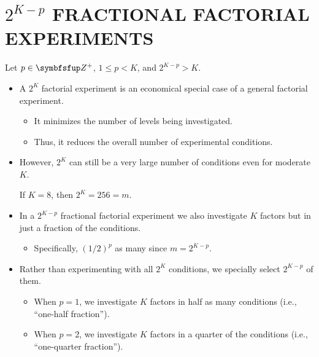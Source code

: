 \chapter{\texorpdfstring{$ 2^{K-p} $}{2K-p} FRACTIONAL FACTORIAL EXPERIMENTS}
Let $ p\in\Field{Z}^+ $, $ 1\le p<K $, and $ 2^{K-p}>K $.
\begin{itemize}[*]
    \item A $ 2^K $ factorial experiment is an economical special case of a general factorial experiment.
          \begin{itemize}[$\rightarrow$]
              \item It minimizes the number of levels being investigated.
              \item Thus, it reduces the overall number of experimental conditions.
          \end{itemize}
\end{itemize}
\begin{itemize}
    \item However, $ 2^K $ can still be a very large number of conditions even for moderate $ K $.
          \begin{Example}{}{}
              If $ K=8 $, then $ 2^K=256=m $.
          \end{Example}
\end{itemize}
\begin{itemize}[*]
    \item In a $ 2^{K-p} $ fractional factorial experiment we also investigate $ K $ factors but in just a fraction of the
          conditions.
          \begin{itemize}[label={}]
              \item Specifically, $ (1/2)^p $ as many since $ m=2^{K-p} $.
          \end{itemize}
\end{itemize}
\begin{itemize}[$\rightarrow$]
    \item Rather than experimenting with all $ 2^K $ conditions, we specially select $ 2^{K-p} $ of them.
          \begin{itemize}
              \item When $ p=1 $, we investigate $ K $ factors in half as many conditions (i.e., ``one-half fraction'').
              \item When $ p=2 $, we investigate $ K $ factors in a quarter of the conditions (i.e., ``one-quarter fraction'').
          \end{itemize}
\end{itemize}
